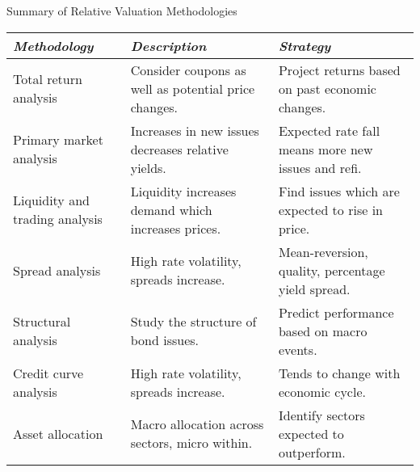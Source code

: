 \documentclass[../custom]{flashcards}
\begin{document}
\begin{flashcard}{Summary of Relative Valuation Methodologies}
    \begin{tabular}{
        >{\raggedright}p{1in}
        >{\raggedright}p{1.6in}
        >{\raggedright\arraybackslash}p{1.6in}}
        \toprule
        \textit{Methodology} & \textit{Description} & \textit{Strategy}\\ \midrule

        Total return analysis &
        Consider coupons as well as potential price changes. &
        Project returns based on past economic changes.\\ \midrule

        Primary market analysis &
        Increases in new issues decreases relative yields. &
        Expected rate fall means more new issues and refi.\\ \midrule

        Liquidity and trading analysis &
        Liquidity increases demand which increases prices. &
        Find issues which are expected to rise in price.\\ \midrule

        Spread analysis &
        High rate volatility, spreads increase. &
        Mean-reversion, quality, percentage yield spread.\\ \midrule

        Structural analysis &
        Study the structure of bond issues. &
        Predict performance based on macro events.\\ \midrule

        Credit curve analysis &
        High rate volatility, spreads increase. &
        Tends to change with economic cycle. \\ \midrule

        Asset allocation &
        Macro allocation across sectors, micro within. &
        Identify sectors expected to outperform.\\
        \bottomrule
    \end{tabular}
\end{flashcard}
\end{document}
